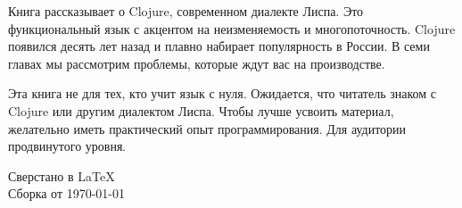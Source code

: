 \thispagestyle{empty}

\small

Книга рассказывает о Clojure, современном диалекте Лиспа. Это функциональный
язык с акцентом на неизменяемость и многопоточность. Clojure появился десять лет
назад и плавно набирает популярность в России. В семи главах мы рассмотрим
проблемы, которые ждут вас на производстве.

Эта книга не для тех, кто учит язык с нуля. Ожидается, что читатель знаком с
Clojure или другим диалектом Лиспа. Чтобы лучше усвоить материал, желательно
иметь практический опыт программирования. Для аудитории продвинутого уровня.

\normalfont

\vspace{5em}

\noindent
Сверстано в \LaTeX\\
Сборка от \today
